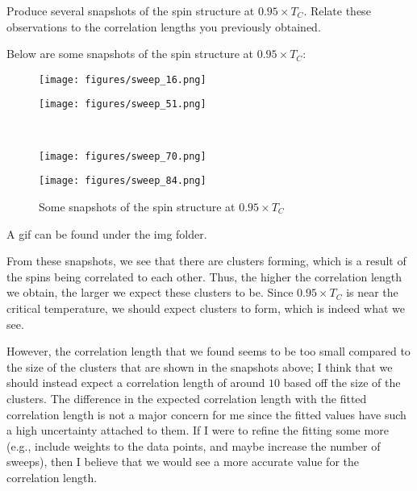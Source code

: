 \begin{qBox}{5}
Produce several snapshots of the spin structure at \( 0.95 \times T_{ C } \).
Relate these observations to the correlation lengths you previously obtained.

\tcblower

Below are some snapshots of the spin structure at \( 0.95 \times T_{ C } \):
\begin{figure}[H]
    \centering
    \begin{minipage}{0.45\linewidth}
        \centering
        \texttt{[image: figures/sweep\_16.png]}
    \end{minipage}%
    \begin{minipage}{0.45\linewidth}
        \centering
        \texttt{[image: figures/sweep\_51.png]}
    \end{minipage}%
    \\
    \begin{minipage}{0.45\linewidth}
        \centering
        \texttt{[image: figures/sweep\_70.png]}
    \end{minipage}%
    \begin{minipage}{0.45\linewidth}
        \centering
        \texttt{[image: figures/sweep\_84.png]}
    \end{minipage}%
    \caption{Some snapshots of the spin structure at \( 0.95 \times T_{ C } \)}
\end{figure}
A gif can be found under the img folder.

\baseSkip 

From these snapshots, we see that there are clusters forming, which is a result of 
the spins being correlated to each other. 
Thus, the higher the correlation length we obtain, the larger we expect these 
clusters to be. 
Since \( 0.95 \times T_{ C } \) is near the critical temperature, we should expect 
clusters to form, which is indeed what we see. 

\baseSkip 

However, the correlation length that we found seems to be too small compared to the 
size of the clusters that are shown in the snapshots above; I think that we should 
instead expect a correlation length of around \( 10 \) based off the size of the 
clusters. 
The difference in the expected correlation length with the fitted correlation 
length is not a major concern for me since the fitted values have such a high 
uncertainty attached to them. 
If I were to refine the fitting some more (e.g., include weights to the data points, and maybe increase the number of sweeps), then I believe that we would see a more 
accurate value for the correlation length.
\end{qBox}